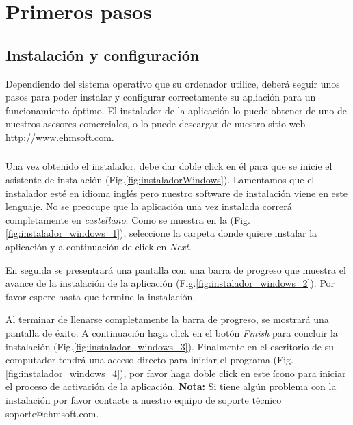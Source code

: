 \chapter{Primeros pasos}
\setcounter{page}{4}

\section{Instalaci\'on y configuraci\'on}
Dependiendo del sistema operativo que su ordenador utilice, deber\'a seguir unos pasos para poder instalar y
configurar correctamente su apliaci\'on para un funcionamiento \'optimo. El instalador de la aplicaci\'on lo puede obtener de uno de nuestros asesores comerciales, o lo puede descargar de nuestro sitio web \url{http://www.ehmsoft.com}.

\subsection{\windows}
Una vez obtenido el instalador, debe dar doble click en \'el para que se inicie el asistente de instalaci\'on (Fig.\ref{fig:instaladorWindows}). Lamentamos que el instalador est\'e en idioma ingl\'es pero nuestro software de instalaci\'on viene en este lenguaje. No se preocupe que la aplicaci\'on una vez instalada correr\'a completamente en \emph{castellano}. Como se muestra en la (Fig.\ref{fig:instalador_windows_1}), seleccione la carpeta donde quiere instalar la aplicaci\'on y a continuaci\'on de click en \emph{Next}.

En seguida se presentrar\'a una pantalla con una barra de progreso que muestra el avance de la instalaci\'on de la aplicaci\'on (Fig.\ref{fig:instalador_windows_2}). Por favor espere hasta que termine la instalaci\'on.

Al terminar de llenarse completamente la barra de progreso, se mostrar\'a una pantalla de \'exito. A continuaci\'on haga click en el bot\'on \emph{Finish} para concluir la instalaci\'on (Fig.\ref{fig:instalador_windows_3}).
Finalmente en el escritorio de su computador tendr\'a una acceso directo para iniciar el programa \softwareAbogadosDesktop (Fig.\ref{fig:instalador_windows_4}), por favor haga doble click en este \'icono para iniciar el proceso de activaci\'on de la aplicaci\'on.
\textbf{Nota:} Si tiene alg\'un problema con la instalaci\'on por favor contacte a nuestro equipo de soporte t\'ecnico \mbox{soporte@ehmsoft.com}.

